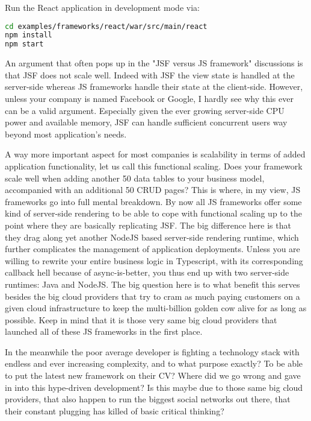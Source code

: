 Run the React application in development mode via:
\begin{lstlisting}[language=bash]
cd examples/frameworks/react/war/src/main/react
npm install
npm start
\end{lstlisting}

An argument that often pops up in the "JSF versus JS framework" discussions is that JSF does not scale well.
Indeed with JSF the view state is handled at the server-side whereas JS frameworks handle their state at the client-side.
However, unless your company is named Facebook or Google, I hardly see why this ever can be a valid argument.
Especially given the ever growing server-side CPU power and available memory, JSF can handle sufficient concurrent users way beyond most application's needs.

A way more important aspect for most companies is scalability in terms of added application functionality, let us call this functional scaling.
Does your framework scale well when adding another 50 data tables to your business model, accompanied with an additional 50 CRUD pages?
This is where, in my view, JS frameworks go into full mental breakdown.
By now all JS frameworks offer some kind of server-side rendering to be able to cope with functional scaling up to the point where they are basically replicating JSF.
The big difference here is that they drag along yet another NodeJS based server-side rendering runtime, which further complicates the management of application deployments.
Unless you are willing to rewrite your entire business logic in Typescript, with its corresponding callback hell because of async-is-better, you thus end up with two server-side runtimes: Java and NodeJS.
The big question here is to what benefit this serves besides the big cloud providers that try to cram as much paying customers on a given cloud infrastructure to keep the multi-billion golden cow alive for as long as possible.
Keep in mind that it is those very same big cloud providers that launched all of these JS frameworks in the first place.

In the meanwhile the poor average developer is fighting a technology stack with endless and ever increasing complexity, and to what purpose exactly?
To be able to put the latest new framework on their CV?
Where did we go wrong and gave in into this hype-driven development?
Is this maybe due to those same big cloud providers, that also happen to run the biggest social networks out there, that their constant plugging has killed of basic critical thinking?